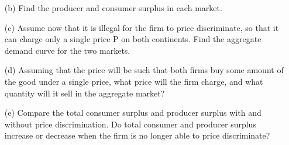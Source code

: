 \documentclass[11pt]{article}
\begin{document}
\begin{enumerate}
\begin{enumerate}
    \item[(b)] Find the producer and consumer surplus in each market.

    \item[(c)] Assume now that it is illegal for the firm to price discriminate, so that it can charge only a single price $\mathrm{P}$ on both continents. Find the aggregate demand curve for the two markets.

    \item[(d)] Assuming that the price will be such that both firms buy some amount of the good under a single price, what price will the firm charge, and what quantity will it sell in the aggregate market?

    \item[(e)] Compare the total consumer surplus and producer surplus with and without price discrimination. Do total consumer and producer surplus increase or decrease when the firm is no longer able to price discriminate?
  \end{enumerate}
\end{enumerate}
\end{document}
